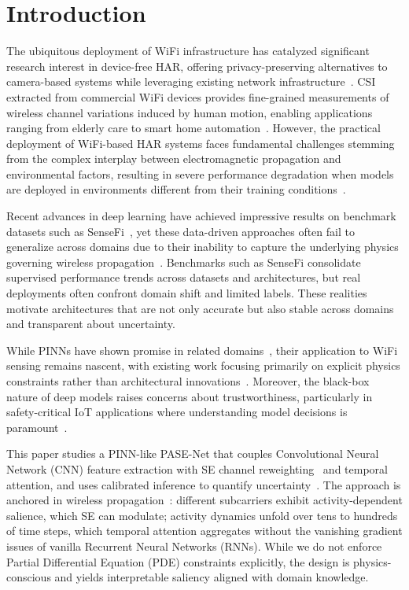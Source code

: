 \documentclass[journal]{IEEEtran}
\begin{document}
\section{Introduction}
The ubiquitous deployment of WiFi infrastructure has catalyzed significant research interest in device-free HAR, offering privacy-preserving alternatives to camera-based systems while leveraging existing network infrastructure~\cite{liu2024wifi,wang2023privacy}. CSI extracted from commercial WiFi devices provides fine-grained measurements of wireless channel variations induced by human motion, enabling applications ranging from elderly care to smart home automation~\cite{zhang2023attention,iotj2023applications}. However, the practical deployment of WiFi-based HAR systems faces fundamental challenges stemming from the complex interplay between electromagnetic propagation and environmental factors, resulting in severe performance degradation when models are deployed in environments different from their training conditions~\cite{li2024cross,domain2023shift}.

Recent advances in deep learning have achieved impressive results on benchmark datasets such as SenseFi~\cite{yang2023sensefi}, yet these data-driven approaches often fail to generalize across domains due to their inability to capture the underlying physics governing wireless propagation~\cite{chen2022physics,pinn2023wireless}. Benchmarks such as SenseFi consolidate supervised performance trends across datasets and architectures, but real deployments often confront domain shift and limited labels. These realities motivate architectures that are not only accurate but also stable across domains and transparent about uncertainty.

While PINNs have shown promise in related domains~\cite{raissi2019physics,karniadakis2021physics}, their application to WiFi sensing remains nascent, with existing work focusing primarily on explicit physics constraints rather than architectural innovations~\cite{physics2023sensing}. Moreover, the black-box nature of deep models raises concerns about trustworthiness, particularly in safety-critical IoT applications where understanding model decisions is paramount~\cite{trustworthy2023iot,calibration_guo2017}.

This paper studies a PINN-like PASE-Net that couples Convolutional Neural Network (CNN) feature extraction with SE channel reweighting~\cite{se_networks2018} and temporal attention, and uses calibrated inference to quantify uncertainty~\cite{calibration_guo2017}. The approach is anchored in wireless propagation~\cite{goldsmith2005wireless}: different subcarriers exhibit activity-dependent salience, which SE can modulate; activity dynamics unfold over tens to hundreds of time steps, which temporal attention aggregates without the vanishing gradient issues of vanilla Recurrent Neural Networks (RNNs). While we do not enforce Partial Differential Equation (PDE) constraints explicitly, the design is physics-conscious and yields interpretable saliency aligned with domain knowledge.
\end{document}
